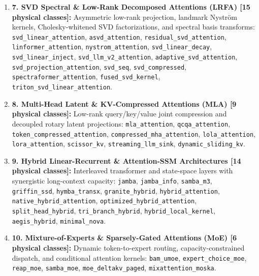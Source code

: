 \documentclass{article}
\begin{document}
\begin{enumerate}
    \texttt{adaptive\_span\_attention}, \texttt{adaptive\_sparse\_attention}, \texttt{adasplash\_attention}, \texttt{cluster\_attention}, \texttt{block\_transformer\_hiba}, \texttt{nsa\_attention}, \texttt{lsh\_attention}, \texttt{routing\_attention}, \texttt{sink\_attention}, \texttt{dynamic\_conv\_attention}, \texttt{hamming\_attention}, \texttt{moba\_attention}, \texttt{progressive\_token\_pruning}.
    \item \textbf{7. SVD Spectral \& Low-Rank Decomposed Attentions (LRFA) [15 physical classes]:} Asymmetric low-rank projection, landmark Nystr\"om kernels, Cholesky-whitened SVD factorizations, and spectral basis transforms:
    \texttt{svd\_linear\_attention}, \texttt{asvd\_attention}, \texttt{residual\_svd\_attention}, \texttt{linformer\_attention}, \texttt{nystrom\_attention}, \texttt{svd\_linear\_decay}, \texttt{svd\_linear\_inject}, \texttt{svd\_llm\_v2\_attention}, \texttt{adaptive\_svd\_attention}, \texttt{svd\_projection\_attention}, \texttt{svd\_seq}, \texttt{svd\_compressed}, \texttt{spectraformer\_attention}, \texttt{fused\_svd\_kernel}, \texttt{triton\_svd\_linear\_attention}.
    \item \textbf{8. Multi-Head Latent \& KV-Compressed Attentions (MLA) [9 physical classes]:} Low-rank query/key/value joint compression and decoupled rotary latent projections:
    \texttt{mla\_attention}, \texttt{qcqa\_attention}, \texttt{token\_compressed\_attention}, \texttt{compressed\_mha\_attention}, \texttt{lola\_attention}, \texttt{lora\_attention}, \texttt{scissor\_kv}, \texttt{streaming\_llm\_sink}, \texttt{dynamic\_sliding\_kv}.
    \item \textbf{9. Hybrid Linear-Recurrent \& Attention-SSM Architectures [14 physical classes]:} Interleaved transformer and state-space layers with synergistic long-context capacity:
    \texttt{jamba}, \texttt{jamba\_info}, \texttt{samba\_m3}, \texttt{griffin\_ssd}, \texttt{hymba\_transx}, \texttt{granite\_hybrid}, \texttt{hybrid\_attention}, \texttt{native\_hybrid\_attention}, \texttt{optimized\_hybrid\_attention}, \texttt{split\_head\_hybrid}, \texttt{tri\_branch\_hybrid}, \texttt{hybrid\_local\_kernel}, \texttt{aegis\_hybrid}, \texttt{minimal\_nova}.
    \item \textbf{10. Mixture-of-Experts \& Sparsely-Gated Attentions (MoE) [6 physical classes]:} Dynamic token-to-expert routing, capacity-constrained dispatch, and conditional attention kernels:
    \texttt{bam\_umoe}, \texttt{expert\_choice\_moe}, \texttt{reap\_moe}, \texttt{samba\_moe}, \texttt{moe\_deltakv\_paged}, \texttt{mixattention\_moska}.

\end{enumerate}
\end{document}
